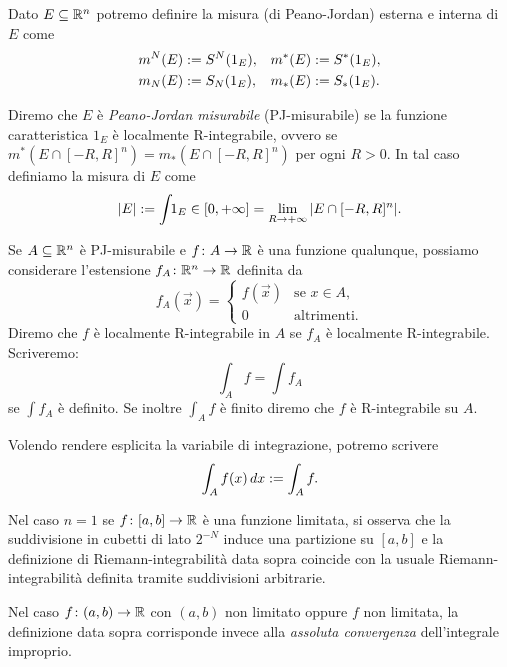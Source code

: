 \begin{definition}
Dato $E\subseteq {\mathbb R}^n$ potremo definire la misura (di Peano-Jordan) esterna 
e interna di $E$ come 
\begin{align*}
 m^N(E) &:= S^N(1_E), & m^*(E) &:= S^*(1_E),\\
 m_N(E) &:= S_N(1_E), & m_*(E) &:= S_*(1_E).
\end{align*}

Diremo che $E$ è \emph{Peano-Jordan misurabile} 
(PJ-misurabile) se la funzione caratteristica $1_E$ è localmente 
R-integrabile,
ovvero se $m^*(E\cap[-R,R]^n) = m_*(E\cap[-R,R]^n)$ per ogni $R>0$.
In tal caso definiamo la misura di $E$ come 
\[
{\left|E\right|} := \int\!\! 1_E \in [0,+\infty] = \lim_{R\to+\infty} {\left|E\cap[-R,R]^n\right|}.
\]


Se $A\subseteq {\mathbb R}^n$ è PJ-misurabile e $f\colon A \to {\mathbb R}$
è una funzione qualunque, possiamo considerare l'estensione 
$f_A\colon {\mathbb R}^n \to {\mathbb R}$ definita da 
\[
 f_A(\vec x) = \begin{cases}
    f(\vec x) & \text{se $x\in A$,}\\
    0 & \text{altrimenti.}
 \end{cases}
\]
Diremo che $f$ è localmente R-integrabile in $A$ se $f_A$ 
è localmente R-integrabile. 
Scriveremo:
\[
 \int_A f = \int\!\! f_A
\]
se $\int f_A$ è definito.
Se inoltre $\int_A f$ è finito diremo che $f$ è R-integrabile
su $A$.

Volendo rendere esplicita la variabile di integrazione, potremo 
scrivere 
\[
  \int_A f(x)\, dx := \int_A f.
\]
\end{definition}

\begin{remark}[caso $n=1$]
Nel caso $n=1$ se $f\colon [a,b]\to {\mathbb R}$ è una funzione limitata,
si osserva che la suddivisione in cubetti di lato $2^{-N}$ induce una partizione 
su $[a,b]$ e la definizione di Riemann-integrabilità data sopra coincide con la 
usuale Riemann-integrabilità definita tramite suddivisioni arbitrarie.

Nel caso $f\colon(a,b)\to {\mathbb R}$ con $(a,b)$ non limitato oppure $f$ non limitata,
la definizione data sopra corrisponde invece alla \emph{assoluta convergenza} 
dell'integrale improprio.
\end{remark}

